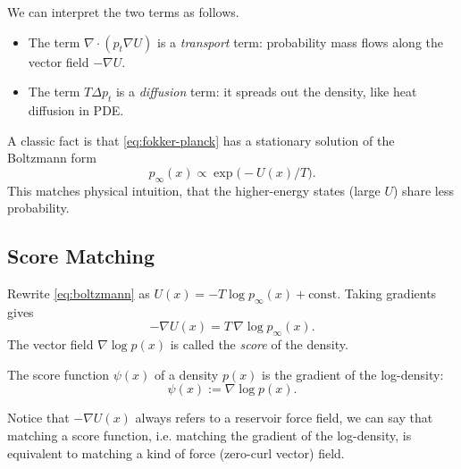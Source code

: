 \documentclass[../main]{subfiles}
\begin{document}
We can interpret the two terms as follows.

\begin{itemize}
\item The term $\nabla\cdot(p_t\nabla U)$ is a \emph{transport} term: probability mass flows along the
      vector field $-\nabla U$.
\item The term $T\Delta p_t$ is a \emph{diffusion} term: it spreads out the density, like heat
      diffusion in PDE.
\end{itemize}

A classic fact is that \eqref{eq:fokker-planck} has a stationary solution of the Boltzmann form
\begin{equation}\label{eq:boltzmann}
    p_\infty(x) \propto \exp\bigl(-U(x)/T\bigr).
\end{equation}
This matches physical intuition, that the higher-energy states (large $U$) share less probability.

\subsection{Score Matching}

Rewrite \eqref{eq:boltzmann} as $U(x) = -T\log p_\infty(x) + \mathrm{const}$. Taking gradients gives
\begin{equation}\label{eq:score-force}
    -\nabla U(x) = T\,\nabla \log p_\infty(x).
\end{equation}
The vector field $\nabla \log p(x)$ is called the \emph{score} of the density. 
\begin{definition}[Score]
    The score function $\psi(x)$ of a density $p(x)$ is the gradient of the log-density:
    \begin{equation}
        \psi(x) := \nabla \log p(x).
    \end{equation}
\end{definition}
Notice that $-\nabla U(x)$ always refers to a reservoir force field, we can say that matching a score function, i.e. matching the gradient of the log-density, is equivalent to matching a kind of force (zero-curl vector) field.
\end{document}
